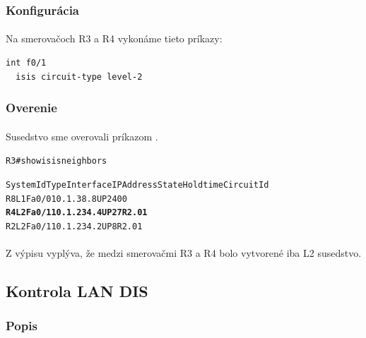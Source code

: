 \documentclass[12pt,twoside,a4paper]{report}
\begin{document}
\subsubsection{Konfigurácia}
\paragraph{}
Na smerovačoch R3 a R4 vykonáme tieto príkazy:

\noindent
{\selectfont
\begin{small}
\begin{verbatim}
int f0/1
  isis circuit-type level-2
\end{verbatim}
\end{small}
}

\subsubsection{Overenie}
\paragraph{}
Susedstvo sme overovali príkazom .

\noindent
{\selectfont
\begin{small}
\begin{alltt}
R3#show isis neighbors

System Id      Type Interface   IP Address      State Holdtime Circuit Id
R8             L1   Fa0/0       10.1.38.8       UP    24       00
\textbf{R4             L2   Fa0/1       10.1.234.4      UP    27       R2.01}
R2             L2   Fa0/1       10.1.234.2      UP    8        R2.01
\end{alltt}
\end{small}
}

\paragraph{}
Z výpisu vyplýva, že medzi smerovačmi R3 a R4 bolo vytvorené iba L2 susedstvo.






\subsection{Kontrola LAN DIS}
\label{kontrola_lan_dis}
\subsubsection{Popis}
\end{document}
